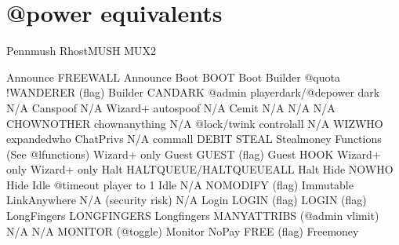 \documentclass[letterpaper,10pt,english]{sphinxmanual}
\begin{document}
\section{@power equivalents}
\label{\detokenize{differences:power-equivalents}}
\begin{sphinxVerbatim}[commandchars=\\\{\}]
Pennmush                RhostMUSH                                          MUX2

Announce                FREE\PYGZus{}WALL                                          Announce
Boot                    BOOT                                               Boot
Builder                 @quota !WANDERER (flag)                            Builder
CAN\PYGZus{}DARK                @admin player\PYGZus{}dark/@depower dark                   N/A
Can\PYGZus{}spoof               N/A \PYGZhy{} Wizard+ auto\PYGZhy{}spoof                           N/A
Cemit                   N/A                                                N/A
N/A                     CHOWN\PYGZus{}OTHER                                        chown\PYGZus{}anything
N/A                     @lock/twink                                        control\PYGZus{}all
N/A                     WIZ\PYGZus{}WHO                                            expanded\PYGZus{}who
Chat\PYGZus{}Privs              N/A                                                comm\PYGZus{}all
DEBIT                   STEAL                                              Steal\PYGZus{}money
Functions               (See @lfunctions)                                  Wizard+ only
Guest                   GUEST (flag)                                       Guest
HOOK                    Wizard+ only                                       Wizard+ only
Halt                    HALT\PYGZus{}QUEUE/HALT\PYGZus{}QUEUE\PYGZus{}ALL                          Halt
Hide                    NOWHO                                              Hide
Idle                    @timeout player to \PYGZhy{}1                              Idle
N/A                     NO\PYGZus{}MODIFY (flag)                                   Immutable
Link\PYGZus{}Anywhere           N/A (security risk)                                N/A
Login                   LOGIN (flag)                                       LOGIN (flag)
Long\PYGZus{}Fingers            LONG\PYGZus{}FINGERS                                       Long\PYGZus{}fingers
MANY\PYGZus{}ATTRIBS            (@admin vlimit)                                    N/A
N/A                     MONITOR (@toggle)                                  Monitor
No\PYGZus{}Pay                  FREE (flag)                                        Free\PYGZus{}money

\end{sphinxVerbatim}
\end{document}
